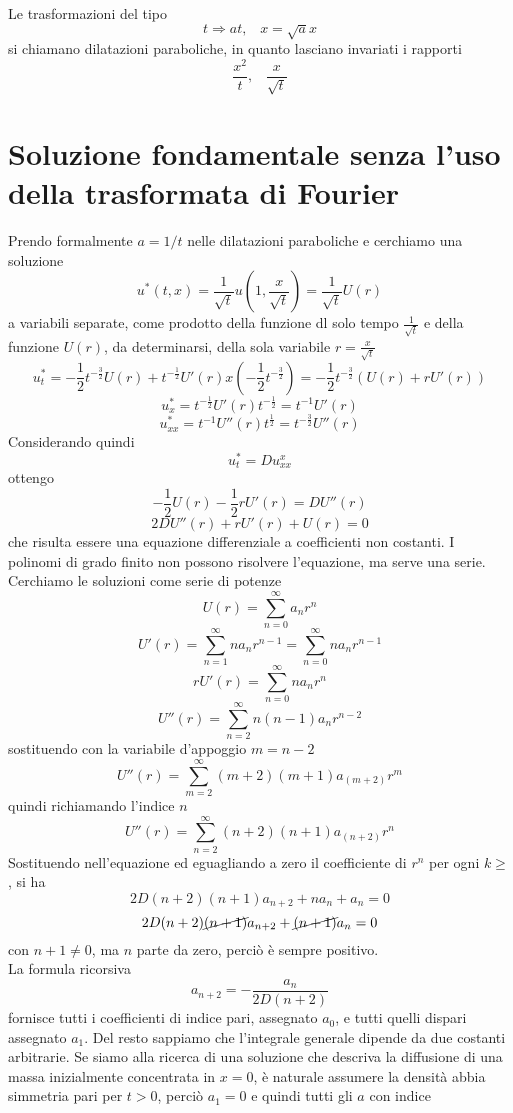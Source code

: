 Le trasformazioni del tipo
\[
	t\Rightarrow at, \;\;\; x=\sqrt{a} x
\]
si chiamano dilatazioni paraboliche, in quanto lasciano invariati i rapporti
\[
	\frac{x^2}{t}, \;\;\; \frac{x}{\sqrt{t}}
\]
\section{Soluzione fondamentale senza l'uso della trasformata di Fourier}
Prendo formalmente $a= 1/t$ nelle dilatazioni paraboliche e cerchiamo una soluzione 
\[
	u^*(t,x)= \frac{1}{\sqrt{t}}u \left( 1, \frac{x}{\sqrt{t}} \right)=
	\frac{1}{\sqrt{t}}U \left( r \right)
\]
a variabili separate, come prodotto della funzione dl solo tempo $\frac{1}{\sqrt{t}}$ e della funzione $U(r)$, da determinarsi, della sola variabile
$r=\frac{x}{\sqrt{t}}$
\[
	u^*_t= -\frac{1}{2}t^{-\frac{3}{2}} U(r)
	+ t^{-\frac{1}{2}}U'(r) x \left( -\frac{1}{2}t^{-\frac{3}{2}} \right)
	= -\frac{1}{2}t^{-\frac{3}{2}} \left( U(r)+ rU'(r) \right)
\]
\[
	u^*_x= t^{-\frac{1}{2}}U'(r)t^{-\frac{1}{2}}=
	t^{-1} U'(r)
\]
\[
	u^*_{xx}=t^{-1}U''(r)t^{\frac{1}{2}}=
	t^{-\frac{3}{2}}U''(r)
\]
Considerando quindi
\[
	u^*_t=Du^x_{xx}
\]
ottengo
\[
	-\frac{1}{2} U(r) -\frac{1}{2}rU'(r)= DU''(r)
\]
\[
	2DU''(r)+ rU'(r)+ U(r)= 0
\]
che risulta essere una equazione differenziale a coefficienti non costanti.
I polinomi di grado finito non possono risolvere l'equazione, ma serve una serie.
Cerchiamo le soluzioni come serie di potenze
\[
	U(r)= \sum_{n=0}^{\infty}a_n r^n
\]
\[
	U'(r)= \sum_{n=1}^{\infty} n a_n r^{n-1}
	= \sum_{n=0}^{\infty} n a_n r^{n-1}
\]
\[
	rU'(r)= \sum_{n=0}^{\infty} na_n r^n
\]
\[
	U''(r)=\sum_{n=2}^{\infty} n(n-1)a_n r^{n-2}
\]
sostituendo con la variabile d'appoggio $m=n-2$
\[
	U''(r)=\sum_{m=2}^{\infty} (m+2)(m+1)a_(m+2) r^{m}
\]
quindi richiamando l'indice $n$
\[
	U''(r)=\sum_{n=2}^{\infty} (n+2)(n+1)a_(n+2) r^{n}
\]
Sostituendo nell'equazione ed eguagliando a zero il coefficiente di $r^n$ per 
ogni $k \geq $, si ha
\[
	2D(n+2)(n+1)a_{n+2}+ na_n+ a_n = 0
\]
\[
	2D(n+2)\cancel{(n+1)}a_{n+2}+ \cancel{(n+1)}a_n=0
\]
con $n+1 \neq 0$, ma $n$ parte da zero, perci\`o \`e sempre positivo.\\
La formula ricorsiva
\[
	a_{n+2}= -\frac{a_n}{2D(n+2)}
\]
fornisce tutti i coefficienti di indice pari, assegnato $a_0$, e tutti quelli
dispari assegnato $a_1$.
Del resto sappiamo che l'integrale generale dipende da due costanti arbitrarie.
Se siamo alla ricerca di una soluzione che descriva la diffusione di una massa inizialmente concentrata in $x=0$, \`e naturale assumere la densit\`a abbia
simmetria pari per $t>0$, perci\`o $a_1=0$ e quindi tutti gli $a$ con indice
